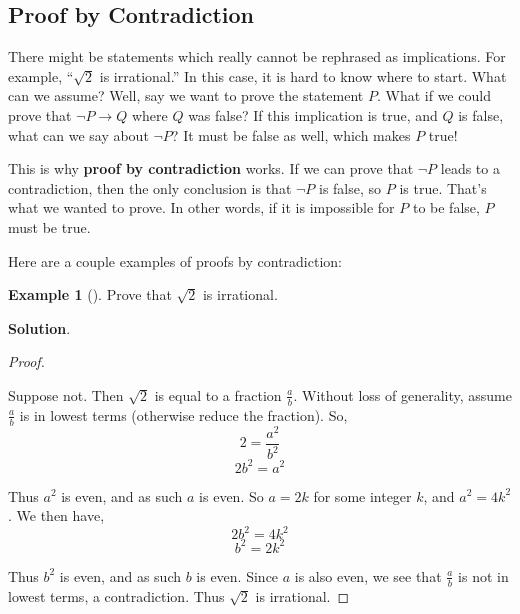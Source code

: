 \documentclass[10pt,]{book}
\newcommand{\terminology}[1]{\textbf{#1}}
\theoremstyle{plain}
\theoremstyle{definition}
\theoremstyle{definition}
\newtheorem{example}[theorem]{Example}
\theoremstyle{definition}
\theoremstyle{definition}
\numberwithin{equation}{chapter}
\def\imp{\rightarrow}
\begin{document}
\subsection[{Proof by Contradiction}]{Proof by Contradiction}\label{subsection-44}
\hypertarget{p-2074}{}%
%
\par
\hypertarget{p-2075}{}%
There might be statements which really cannot be rephrased as implications. For example, ``\(\sqrt 2\) is irrational.'' In this case, it is hard to know where to start. What can we assume? Well, say we want to prove the statement \(P\). What if we could prove that \(\neg P \imp Q\) where \(Q\) was false? If this implication is true, and \(Q\) is false, what can we say about \(\neg P\)? It must be false as well, which makes \(P\) true!%
\par
\hypertarget{p-2076}{}%
This is why \terminology{proof by contradiction} works. If we can prove that \(\neg P\) leads to a contradiction, then the only conclusion is that \(\neg P\) is false, so \(P\) is true. That's what we wanted to prove. In other words, if it is impossible for \(P\) to be false, \(P\) must be true.%
\par
\hypertarget{p-2077}{}%
Here are a couple examples of proofs by contradiction:%
\begin{example}[]\label{example-69}
\hypertarget{p-2078}{}%
Prove that \(\sqrt{2}\) is irrational.%
\par\smallskip%
\noindent\textbf{Solution}.\hypertarget{solution-186}{}\quad%
\begin{proof}\hypertarget{proof-26}{}
\hypertarget{p-2079}{}%
Suppose not. Then \(\sqrt 2\) is equal to a fraction \(\frac{a}{b}\). Without loss of generality, assume \(\frac{a}{b}\) is in lowest terms (otherwise reduce the fraction). So,%
\begin{equation*}
2 = \frac{a^2}{b^2}
\end{equation*}
%
\begin{equation*}
2b^2 = a^2
\end{equation*}
%
\par
\hypertarget{p-2080}{}%
Thus \(a^2\) is even, and as such \(a\) is even. So \(a = 2k\) for some integer \(k\), and \(a^2 = 4k^2\). We then have,%
\begin{equation*}
2b^2 = 4k^2
\end{equation*}
%
\begin{equation*}
b^2 = 2k^2
\end{equation*}
%
\par
\hypertarget{p-2081}{}%
Thus \(b^2\) is even, and as such \(b\) is even. Since \(a\) is also even, we see that \(\frac{a}{b}\) is not in lowest terms, a contradiction. Thus \(\sqrt 2\) is irrational.%
\end{proof}
\end{example}
\end{document}
